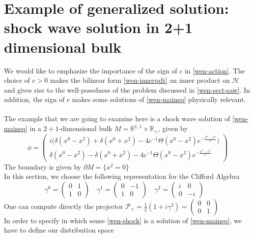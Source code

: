\section{Example of generalized solution: shock wave solution in 2+1 dimensional bulk}
We would like to emphasize the importance of the sign of $c$ in \cref{wen-action}. 
The choice of $c>0$ makes the bilinear form \cref{wen-innerpdt} an inner product on $\mathcal{H}$ and gives rise to the well-posedness of the problem discussed in \cref{wen-sect-saw}.
In addition, the sign of $c$ makes some solutions of \cref{wen-maineq} physically relevant. \\\\
The example that we are going to examine here is a shock wave solution of \cref{wen-maineq} in a $2+1$-dimensional bulk $M = \mathbb{R}^{1,1}\times\mathbb{R}_+$, given by
\begin{equation}\label{wen-shock}
\phi = \begin{pmatrix}
i \big(\delta(x^0 - x^2) + \delta(x^0 + x^2) - 4c^{-1}\Theta(x^0-x^2)e^{- \frac{x^0-x^2}{c}} \big) \\
\delta({x^0 - x^2}) - \delta(x^0 + x^2) - 4c^{-1}\Theta(x^0-x^2)e^{- \frac{x^0-x^2}{c}} \end{pmatrix}
\end{equation}
The boundary is given by $\partial M = \{x^2 = 0\}$ \\
In this section, we choose the following representation for the Clifford Algebra
\begin{equation*}
\gamma^0 = \begin{pmatrix} 0 & 1 \\ 1 &0 \end{pmatrix} \quad
\gamma^1 = \begin{pmatrix} 0 & -1 \\ 1 &0 \end{pmatrix} \quad
\gamma^2 = \begin{pmatrix} i & 0 \\ 0 &-i \end{pmatrix} \quad
\end{equation*}
One can compute directly the projector $\mathcal{P}_+ = \frac{1}{2}(1+i\gamma^2) 
= \begin{pmatrix}0 & 0 \\ 0 & 1 \end{pmatrix}$ \\
In order to specify in which sense \cref{wen-shock} is a solution of \cref{wen-maineq}, we have to define our distribution space

